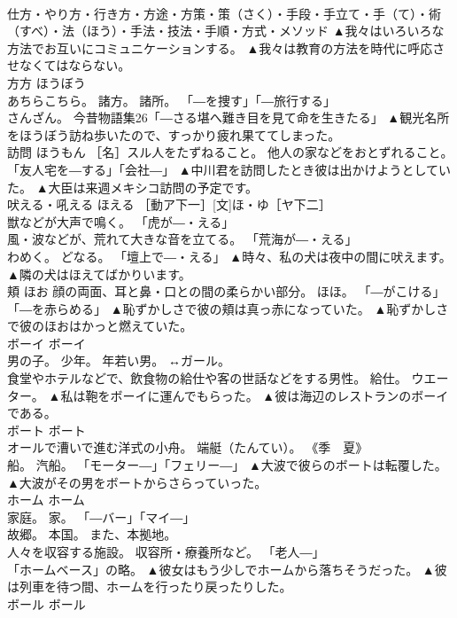 \documentclass[8pt]{extreport}
\begin{document}
\begin{CJK}{UTF8}{min}
\\	仕方・やり方・行き方・方途・方策・策（さく）・手段・手立て・手（て）・術（すべ）・法（ほう）・手法・技法・手順・方式・メソッド	▲我々はいろいろな方法でお互いにコミュニケーションする。 ▲我々は教育の方法を時代に呼応させなくてはならない。
\\	方方	ほうぼう	
\\	あちらこちら。 諸方。 諸所。 「―を捜す」「―旅行する」 
\\	さんざん。 今昔物語集26「―さる堪へ難き目を見て命を生きたる」	▲観光名所をほうぼう訪ね歩いたので、すっかり疲れ果ててしまった。
\\	訪問	ほうもん	［名］スル人をたずねること。 他人の家などをおとずれること。 「友人宅を―する」「会社―」	▲中川君を訪問したとき彼は出かけようとしていた。 ▲大臣は来週メキシコ訪問の予定です。
\\	吠える・吼える	ほえる	［動ア下一］[文]ほ・ゆ［ヤ下二］ 
\\	獣などが大声で鳴く。 「虎が―・える」 
\\	風・波などが、荒れて大きな音を立てる。 「荒海が―・える」 
\\	わめく。 どなる。 「壇上で―・える」	▲時々、私の犬は夜中の間に吠えます。 ▲隣の犬はほえてばかりいます。
\\	頬	ほお	顔の両面、耳と鼻・口との間の柔らかい部分。 ほほ。 「―がこける」「―を赤らめる」	▲恥ずかしさで彼の頬は真っ赤になっていた。 ▲恥ずかしさで彼のほおはかっと燃えていた。
\\	ボーイ	ボーイ	
\\	男の子。 少年。 年若い男。 ↔ガール。 
\\	食堂やホテルなどで、飲食物の給仕や客の世話などをする男性。 給仕。 ウエーター。	▲私は鞄をボーイに運んでもらった。 ▲彼は海辺のレストランのボーイである。
\\	ボート	ボート	
\\	オールで漕いで進む洋式の小舟。 端艇（たんてい）。 《季　夏》 
\\	船。 汽船。 「モーター―」「フェリー―」	▲大波で彼らのボートは転覆した。 ▲大波がその男をボートからさらっていった。
\\	ホーム	ホーム	
\\	家庭。 家。 「―バー」「マイ―」 
\\	故郷。 本国。 また、本拠地。 
\\	人々を収容する施設。 収容所・療養所など。 「老人―」 
\\	「ホームベース」の略。	▲彼女はもう少しでホームから落ちそうだった。 ▲彼は列車を待つ間、ホームを行ったり戻ったりした。
\\	ボール	ボール	

\end{CJK}
\end{document}
